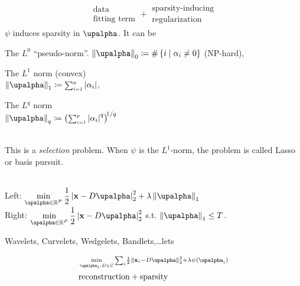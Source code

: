\begin{compactdesc}
\begin{gather*}
		\begin{smallmatrix}
			\text{data}\\
			\text{fitting term}
		\end{smallmatrix}
		+
		\begin{smallmatrix}
			\text{sparsity-inducing}\\
			\text{regularization}
			\end{smallmatrix}
		\end{gather*}
		$\psi$ induces sparsity in $\vtr{\upalpha}$. It can be\\
		\begin{enumerate*}[label=\protect\circled{\arabic*},itemjoin=]
			\item The $L^0$ ``pseudo-norm''. $\norm{\vtr{\upalpha}}_0\coloneqq\#\left\{ i\mid \alpha_i\neq 0 \right\}$ (NP-hard),\\
			\item The $L^1$ norm (convex)\\ $\norm{\vtr{\upalpha}}_1\coloneqq {\scriptstyle\sum_{i=1}^{p}}\abs{\alpha_i}$,\\
			\item The $L^q$ norm\\ $\norm{\vtr{\upalpha}}_q\coloneqq {\left( {\scriptstyle\sum_{i=1}^{p}} \abs{\alpha_i}^q \right)\!}^{1/q}$
		\end{enumerate*}\\
		This is a \emph{selection} problem. When $\psi$ is the $L^1$-norm, the problem is called Lasso or basis pursuit.
	\item[\lp{Incucing sparsity}]\hfill\\
		Left: $\displaystyle\min_{\vtr{\upalpha}\in\mathbb{R}^P}\frac{1}{2}\abs{\vtr{x}-D\vtr{\upalpha}}_{2}^{2}+\lambda\norm{\vtr{\upalpha}}_1$\\
		Right: $\displaystyle\min_{\vtr{\upalpha}\in\mathbb{R}^P}\frac{1}{2}\abs{\vtr{x}-D\vtr{\upalpha}}_{2}^{2}$ s.t. $\norm{\vtr{\upalpha}}_1\leq T$.\\
\item[\lp{Designed dictionaries}] Wavelets, Curvelets, Wedgelets, Bandlets,\ldots lets
\item[\lp{Learned dictionaries of patches}]
	\begin{align*}
		&\scriptstyle\min\limits_{\vtr{\upalpha}_i,D\in\mathcal{C}}{\scriptscriptstyle\sum_{i}^{}}\frac{1}{2}\norm{\vtr{x}_i-D\vtr{\upalpha}}_{2}^{2}+\lambda\psi(\vtr{\upalpha}_i)\\
		&\text{reconstruction}+\text{sparsity}

\end{align*}
\end{compactdesc}
